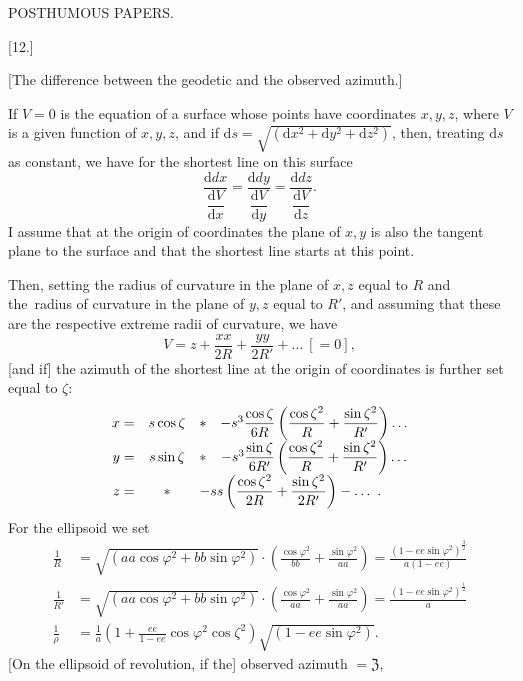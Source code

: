 \clearpage
{}\hfill POSTHUMOUS PAPERS.\hfill\mbox{}\par
\begin{center}[12.]\end{center}
\begin{center}[The difference between the geodetic and the observed azimuth.]\end{center}
If $V=0$ is the equation of a surface whose points have coordinates $x,y,z$, where $V$ is a given function of $x,y,z$, and if $\mathrm ds=\sqrt{(\mathrm dx^2+\mathrm dy^2+\mathrm dz^2)}$, then, treating $\mathrm ds$ as constant, we have for the shortest line on this surface
\[
\frac{\mathrm ddx}{\dfrac{\mathrm dV}{\mathrm dx}}=\frac{\mathrm ddy}{\dfrac{\mathrm dV}{\mathrm dy}}=\frac{\mathrm ddz}{\dfrac{\mathrm dV}{\mathrm dz}}.
\]
I assume that at the origin of coordinates the plane of $x,y$ is also the tangent plane to the surface and that the shortest line starts at this point.

Then, setting the radius of curvature in the plane of $x,z$ equal to $R$ and the\textperiodcentered\ radius of curvature in the plane of $y,z$ equal to $R'$, and assuming that these are the respective extreme radii of curvature, we have
\[
V=z+\frac{xx}{2R}+\frac{yy}{2R'}+\ldots\ [=0],
\]
[and if] the azimuth of the shortest line at the origin of coordinates is further set equal to $\zeta$:
\[
\begin{array}{rclcl}
x=&s\cos\zeta&*&-s^3\dfrac{\cos\zeta}{6R}\left(\dfrac{\cos\zeta^2}{R}+\dfrac{\sin\zeta^2}{R'}\right)\ldots\\[4pt]
y=&s\sin\zeta&*&-s^3\dfrac{\sin\zeta}{6R'}\left(\dfrac{\cos\zeta^2}{R}+\dfrac{\sin\zeta^2}{R'}\right)\ldots\\[4pt]
z=&*&\multicolumn{2}{l}{-ss\left(\dfrac{\cos\zeta^2}{2R}+\dfrac{\sin\zeta^2}{2R'}\right)-\ldots\ .}
\end{array}
\]
For the ellipsoid we set
\[
\begin{aligned}
\frac1R&=\sqrt{(aa\cos\varphi^2+bb\sin\varphi^2)}\cdot\left(\frac{\cos\varphi^2}{bb}+\frac{\sin\varphi^2}{aa}\right)=\frac{(1-ee\sin\varphi^2)^{\frac32}}{a(1-ee)}\\
\frac1{R'}&=\sqrt{(aa\cos\varphi^2+bb\sin\varphi^2)}\cdot\left(\frac{\cos\varphi^2}{aa}+\frac{\sin\varphi^2}{aa}\right)=\frac{(1-ee\sin\varphi^2)^{\frac12}}a\\
\frac1\rho&=\frac1a\left(1+\frac{ee}{1-ee}\cos\varphi^2\cos\zeta^2\right)\sqrt{(1-ee\sin\varphi^2)}.
\end{aligned}
\]
[On the ellipsoid of revolution, if the] observed azimuth $=\mathfrak Z$,

